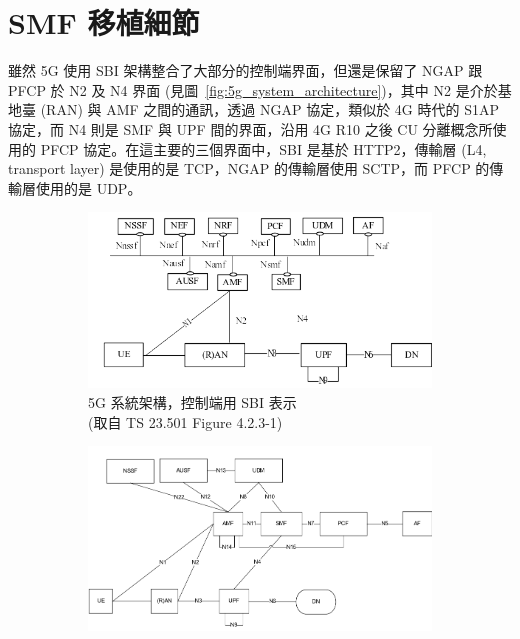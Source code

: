 \section{SMF 移植細節}
\label{sec:smf_porting}

雖然 5G 使用 SBI 架構整合了大部分的控制端界面，但還是保留了 NGAP 跟 PFCP 於 N2 及 N4 界面 (見圖~\ref{fig:5g_system_architecture})，其中 N2 是介於基地臺 (RAN) 與 AMF 之間的通訊，透過 NGAP 協定，類似於 4G 時代的 S1AP 協定，而 N4 則是 SMF 與 UPF 間的界面，沿用 4G R10 之後 CU 分離概念所使用的 PFCP 協定。在這主要的三個界面中，SBI 是基於 HTTP2，傳輸層 (L4, transport layer) 是使用的是 TCP，NGAP 的傳輸層使用 SCTP，而 PFCP 的傳輸層使用的是 UDP。

\begin{figure}[ht]
    \centering
    \captionsetup{justification=centering}
    \begin{subfigure}[b]{.5\linewidth}
        \centering
        \includegraphics[height=!,width=0.95\linewidth,keepaspectratio=true]{figures/23_501_4-2-3-1_sys_arch_sbi}
        \caption[5G 系統架構，控制端用 SBI 表示]{{5G 系統架構，控制端用 SBI 表示\\\scriptsize (取自 TS 23.501 Figure 4.2.3-1)}}
        \label{fig:5g_system_architecture_sbi}
    \end{subfigure}%
    \begin{subfigure}[b]{.5\linewidth}
        \centering
        \includegraphics[height=!,width=0.95\linewidth,keepaspectratio=true]{figures/23_501_4-2-3-2_sys_arch_ref}

\end{subfigure}
\end{figure}

